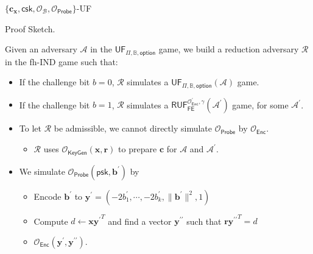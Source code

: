 \begin{frame}{$\{ \mathbf{c_x}, \textsf{csk}, \mathcal{O}_\mathcal{B}, \mathcal{O}_{\textsf{Probe}} \}$-UF}

\begin{block}{Proof Sketch.}

Given an adversary $\mathcal{A}$ in the $\textsf{UF}_{\Pi, \mathbb{B}, \textsf{option}}$ game, we build a reduction adversary $\mathcal{R}$ in the fh-IND game such that:

\begin{itemize}
	\item<2-> If the challenge bit $b = 0$, $\mathcal{R}$ simulates a $\textsf{UF}_{\Pi, \mathbb{B}, \textsf{option}}(\mathcal{A})$ game.

	\item<2-> If the challenge bit $b = 1$, $\mathcal{R}$ simulates a $\textsf{RUF}^{\mathcal{O}^\prime_{\textsf{Enc}}, \gamma}_{\textsf{FE}}(\mathcal{A}^\prime)$ game, for some $\mathcal{A}^\prime$.

	\item<3-> To let $\mathcal{R}$ be admissible, we cannot directly simulate $\mathcal{O}_{\textsf{Probe}}$ by $\mathcal{O}_{\textsf{Enc}}$.
	\begin{itemize}
		\item $\mathcal{R}$ uses $\mathcal{O}_{\textsf{KeyGen}}(\mathbf{x}, \mathbf{r})$ to prepare $\mathbf{c}$ for $\mathcal{A}$ and $\mathcal{A}^\prime$.
	\end{itemize}

	\item<4-> We simulate $\mathcal{O}_{\textsf{Probe}}( \textsf{psk}, \mathbf{b}^\prime )$ by
	\begin{itemize}
		\item Encode $\mathbf{b}^\prime$ to $\mathbf{y}^\prime = (-2b_1^\prime, \cdots, \allowbreak -2b_k^\prime, \|\mathbf{b}^\prime\|^2, 1)$
		\item Compute $d \gets \mathbf{x}{\mathbf{y}^\prime}^T$ and find a vector $\mathbf{y}^{\prime\prime}$ such that $\mathbf{r}{\mathbf{y}^{\prime\prime}}^T = d$
		\item $\mathcal{O}_{\textsf{Enc}}(\mathbf{y}^\prime, {\mathbf{y}^{\prime\prime}})$.
	\end{itemize}

\end{itemize}
\end{block}

\end{frame}


